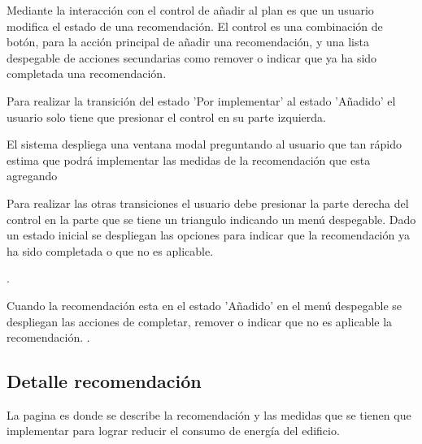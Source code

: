 Mediante la interacción con el control de añadir al plan es que un usuario
modifica el estado de una recomendación. El control es una combinación
de botón, para la acción principal de añadir una recomendación, y una lista
despegable de acciones secundarias como remover o indicar que ya ha sido
completada una recomendación.

Para realizar la transición del estado 'Por implementar' al estado 'Añadido' el
usuario solo tiene que presionar el control en su parte izquierda.

El sistema despliega una ventana modal preguntando al usuario que tan
rápido estima que podrá implementar las medidas de la recomendación
que esta agregando


Para realizar las otras transiciones el usuario debe presionar la parte derecha
del control en la parte que se tiene un triangulo indicando un menú despegable.
Dado un estado inicial se despliegan las opciones para indicar que la
recomendación ya ha sido completada o que no es aplicable.

.

Cuando la recomendación esta en el estado 'Añadido' en el menú despegable
se despliegan las acciones de completar, remover o indicar que no es aplicable
la recomendación.
.

\subsection{Detalle recomendación}

La pagina  es donde se describe la
recomendación y las medidas que se tienen que implementar para lograr
reducir el consumo de energía del edificio.


